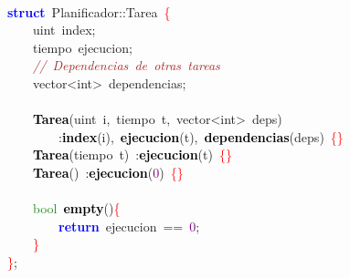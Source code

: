 \mbox{} \\
\mbox{}\textbf{\textcolor{Blue}{struct}}\ \textcolor{TealBlue}{Planificador}\textcolor{BrickRed}{::}Tarea\ \textcolor{Red}{\{} \\
\mbox{}\ \ \ \ \textcolor{TealBlue}{uint}\ index\textcolor{BrickRed}{;} \\
\mbox{}\ \ \ \ \textcolor{TealBlue}{tiempo}\ ejecucion\textcolor{BrickRed}{;} \\
\mbox{}\ \ \ \ \textit{\textcolor{Brown}{//\ Dependencias\ de\ otras\ tareas}} \\
\mbox{}\ \ \ \ \textcolor{TealBlue}{vector\textless{}int\textgreater{}}\ dependencias\textcolor{BrickRed}{;} \\
\mbox{} \\
\mbox{}\ \ \ \ \textbf{\textcolor{Black}{Tarea}}\textcolor{BrickRed}{(}\textcolor{TealBlue}{uint}\ i\textcolor{BrickRed}{,}\ \textcolor{TealBlue}{tiempo}\ t\textcolor{BrickRed}{,}\ \textcolor{TealBlue}{vector\textless{}int\textgreater{}}\ deps\textcolor{BrickRed}{)} \\
\mbox{}\ \ \ \ \ \ \ \ \textcolor{BrickRed}{:}\textbf{\textcolor{Black}{index}}\textcolor{BrickRed}{(}i\textcolor{BrickRed}{),}\ \textbf{\textcolor{Black}{ejecucion}}\textcolor{BrickRed}{(}t\textcolor{BrickRed}{),}\ \textbf{\textcolor{Black}{dependencias}}\textcolor{BrickRed}{(}deps\textcolor{BrickRed}{)}\ \textcolor{Red}{\{\}} \\
\mbox{}\ \ \ \ \textbf{\textcolor{Black}{Tarea}}\textcolor{BrickRed}{(}\textcolor{TealBlue}{tiempo}\ t\textcolor{BrickRed}{)}\ \textcolor{BrickRed}{:}\textbf{\textcolor{Black}{ejecucion}}\textcolor{BrickRed}{(}t\textcolor{BrickRed}{)}\ \textcolor{Red}{\{\}} \\
\mbox{}\ \ \ \ \textbf{\textcolor{Black}{Tarea}}\textcolor{BrickRed}{()}\ \textcolor{BrickRed}{:}\textbf{\textcolor{Black}{ejecucion}}\textcolor{BrickRed}{(}\textcolor{Purple}{0}\textcolor{BrickRed}{)}\ \textcolor{Red}{\{\}} \\
\mbox{} \\
\mbox{}\ \ \ \ \textcolor{ForestGreen}{bool}\ \textbf{\textcolor{Black}{empty}}\textcolor{BrickRed}{()}\textcolor{Red}{\{} \\
\mbox{}\ \ \ \ \ \ \ \ \textbf{\textcolor{Blue}{return}}\ ejecucion\ \textcolor{BrickRed}{==}\ \textcolor{Purple}{0}\textcolor{BrickRed}{;} \\
\mbox{}\ \ \ \ \textcolor{Red}{\}} \\
\mbox{}\textcolor{Red}{\}}\textcolor{BrickRed}{;} \\
